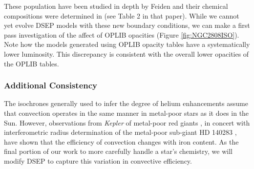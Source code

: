These population have been studied in depth by Feiden and their chemical
compositions were determined in \citet{Milone2015} (see Table 2 in that paper).
While we cannot yet evolve DSEP models with these new boundary conditions, we
can make a first pass investigation of the affect of OPLIB opacities (Figure
\ref{fig:NGC2808ISO}). Note how the models generated using OPLIB opacity tables
have a systematically lower luminosity. This discrepancy is consistent with
the overall lower opacities of the OPLIB tables. 


\subsubsection{Additional Consistency}
The isochrones generally used to infer the degree of helium enhancements assume that
convection operates in the same manner in metal-poor stars as it does in the
Sun. However, observations from \textit{Kepler} of metal-poor red giants
\citep{Bonaca2012, tayar2017correlation}, in concert with interferometric
radius determination of the metal-poor sub-giant HD 140283
\citep{creevey2015benchmark}, have shown that the efficiency of convection
changes with iron content. As the final portion of our work to more carefully
handle a star's chemistry, we will modify DSEP to capture this variation in
convective efficiency. 
